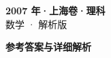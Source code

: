 \documentclass[zihao=-4, a4paper]{ctexart}
\begin{document}
\begin{center}
  {\Large\bfseries 2007 年·上海卷·理科}\\[4pt]
  {\large 数学 · 解析版}
\end{center}
\medskip
{}

\clearpage
{}
\begin{center}{\Large\bfseries 参考答案与详细解析}\end{center}
\medskip

\end{document}
